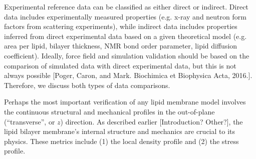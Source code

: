 \documentclass[9pt,bestpractices]{livecoms}
\begin{document}
Experimental reference data can be classified as either direct or indirect.
Direct data includes experimentally measured properties (e.g. x-ray and neutron form factors from scattering experiments), while indirect data includes properties inferred from direct experimental data based on a given theoretical model (e.g. area per lipid, bilayer thickness, NMR bond order parameter, lipid diffusion coefficient).
Ideally, force field and simulation validation should be based on the comparison of simulated data with direct experimental data, but this is not always possible [Poger, Caron, and Mark. Biochimica et Biophysica Acta, 2016.].
Therefore, we discuss both types of data comparisons.

Perhaps the most important verification of any lipid membrane model involves the continuous structural and mechanical profiles in the out-of-plane (``transverse'', or $z$) direction. As described earlier [Introduction? Other?], the lipid bilayer membrane's internal structure and mechanics are crucial to its physics. These metrics include (1) the local density profile and (2) the stress profile.
\end{document}
